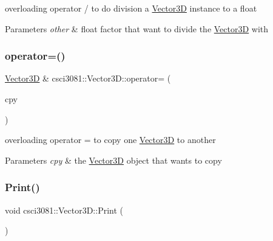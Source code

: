 overloading operator / to do division a \hyperlink{classcsci3081_1_1Vector3D}{Vector3D} instance to a float 


\begin{DoxyParams}{Parameters}
{\em other} & float factor that want to divide the \hyperlink{classcsci3081_1_1Vector3D}{Vector3D} with \\
\hline
\end{DoxyParams}
\mbox{\label{classcsci3081_1_1Vector3D_a57dce219abef3de5e66fc5388731d640}} 
\subsubsection{\texorpdfstring{operator=()}{operator=()}}
{\footnotesize\ttfamily \hyperlink{classcsci3081_1_1Vector3D}{Vector3D} \& csci3081\+::\+Vector3\+D\+::operator= (\begin{DoxyParamCaption}\item[{const \hyperlink{classcsci3081_1_1Vector3D}{Vector3D} \&}]{cpy }\end{DoxyParamCaption})}



overloading operator = to copy one \hyperlink{classcsci3081_1_1Vector3D}{Vector3D} to another 


\begin{DoxyParams}{Parameters}
{\em cpy} & the \hyperlink{classcsci3081_1_1Vector3D}{Vector3D} object that wants to copy \\
\hline
\end{DoxyParams}
\mbox{\label{classcsci3081_1_1Vector3D_a0a010ab4671901254dad6fc2beedadf7}} 
\subsubsection{\texorpdfstring{Print()}{Print()}}
{\footnotesize\ttfamily void csci3081\+::\+Vector3\+D\+::\+Print (\begin{DoxyParamCaption}{ }\end{DoxyParamCaption})\hspace{0.3cm}{\ttfamily [virtual]}}



